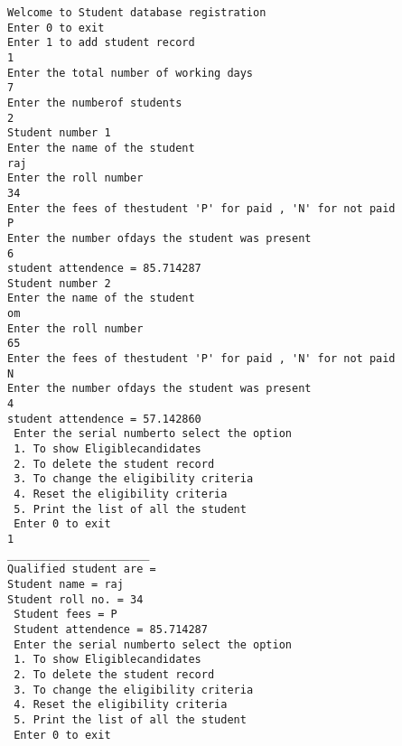 \documentclass{report}
\begin{document}
\begin{verbatim}
Welcome to Student database registration 
Enter 0 to exit 
Enter 1 to add student record 
1
Enter the total number of working days 
7
Enter the numberof students 
2
Student number 1 
Enter the name of the student 
raj
Enter the roll number 
34
Enter the fees of thestudent 'P' for paid , 'N' for not paid 
P
Enter the number ofdays the student was present 
6
student attendence = 85.714287 
Student number 2 
Enter the name of the student 
om
Enter the roll number 
65
Enter the fees of thestudent 'P' for paid , 'N' for not paid 
N
Enter the number ofdays the student was present 
4
student attendence = 57.142860 
 Enter the serial numberto select the option 
 1. To show Eligiblecandidates 
 2. To delete the student record 
 3. To change the eligibility criteria 
 4. Reset the eligibility criteria 
 5. Print the list of all the student 
 Enter 0 to exit 
1
______________________ 
Qualified student are = 
Student name = raj 
Student roll no. = 34 
 Student fees = P 
 Student attendence = 85.714287 
 Enter the serial numberto select the option 
 1. To show Eligiblecandidates 
 2. To delete the student record 
 3. To change the eligibility criteria 
 4. Reset the eligibility criteria 
 5. Print the list of all the student 
 Enter 0 to exit 
\end{verbatim}

\hfill

\break
\end{document}
